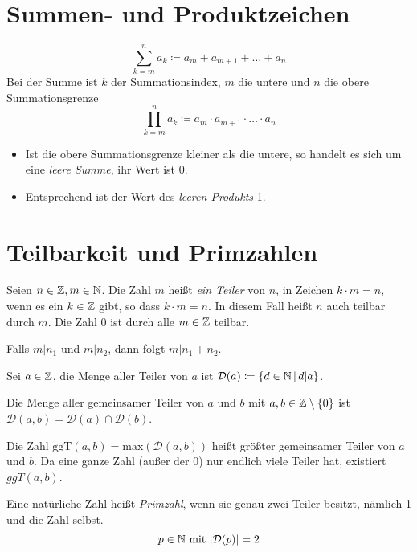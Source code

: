 \section{Summen- und Produktzeichen}
\begin{equation*}
  \sum\limits_{k=m}^n a_k\coloneqq a_m + a_{m+1} + \ldots + a_n
\end{equation*}
Bei der Summe ist $k$ der Summationsindex, $m$ die untere und $n$ die obere Summationsgrenze
\begin{equation*}
  \prod\limits_{k=m}^n a_k\coloneqq a_m \cdot a_{m+1} \cdot \ldots \cdot a_n
\end{equation*}

\bemerkung
\begin{itemize}
  \item Ist die obere Summationsgrenze kleiner als die untere, so handelt es sich um eine \emph{leere Summe}, ihr Wert ist 0.
  \item Entsprechend ist der Wert des \emph{leeren Produkts} 1.
\end{itemize}

\section{Teilbarkeit und Primzahlen}
Seien $n\in\mathbb{Z}, m\in\mathbb{N}$. Die Zahl $m$ heißt \emph{ein Teiler} von $n$, in Zeichen $k\cdot m=n$, wenn es ein $k\in\mathbb{Z}$ gibt, so dass $k\cdot m = n$. In diesem Fall heißt $n$ auch teilbar durch $m$.
Die Zahl $0$ ist durch alle $m\in\mathbb{Z}$ teilbar.

Falls $m|n_1$ und $m|n_2$, dann folgt $m|n_1+n_2$.

Sei $a\in\mathbb{Z}$, die Menge aller Teiler von $a$ ist $\mathcal{D}(a)\coloneqq\left\{ d\in\mathbb{N} \,\middle|\, d|a \right\}$.

Die Menge aller gemeinsamer Teiler von $a$ und $b$ mit $a,b\in\mathbb{Z}\setminus\{ 0\}$ ist $\mathcal{D}(a,b) = \mathcal{D}(a) \cap \mathcal{D}(b)$.

Die Zahl $\mathrm{ggT}(a,b) = \mathrm{max}(\mathcal{D}(a,b))$ heißt größter gemeinsamer Teiler von $a$ und $b$. Da eine ganze Zahl (außer der $0$) nur endlich viele Teiler hat, existiert $ggT(a,b)$.


Eine natürliche Zahl heißt \emph{Primzahl}, wenn sie genau zwei Teiler besitzt, nämlich 1 und die Zahl selbst.
\begin{equation*}
  p\in\mathbb{N} \text{ mit } |\mathcal{D}(p)| = 2
\end{equation*}

